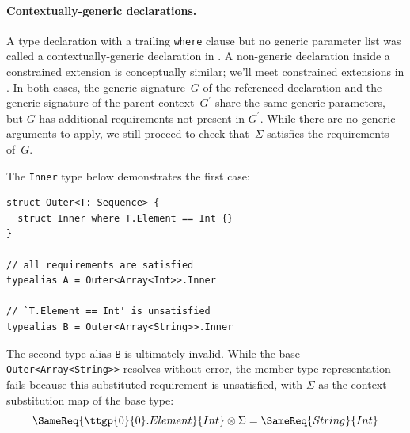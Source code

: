 \documentclass[../generics]{subfiles}
\begin{document}
\paragraph{Contextually-generic declarations.}
A type declaration with a trailing \texttt{where} clause but no generic parameter list was called a contextually-generic declaration in . A non-generic declaration inside a constrained extension is conceptually similar; we'll meet constrained extensions in . In both cases, the generic signature~$G$ of the referenced declaration and the generic signature of the parent context~$G^\prime$ share the same generic parameters, but $G$ has additional requirements not present in $G^\prime$. While there are no generic arguments to apply, we still proceed to check that~$\Sigma$ satisfies the requirements of~$G$.
\begin{example}
The \texttt{Inner} type below demonstrates the first case:
\begin{Verbatim}
struct Outer<T: Sequence> {
  struct Inner where T.Element == Int {}
}

// all requirements are satisfied
typealias A = Outer<Array<Int>>.Inner

// `T.Element == Int' is unsatisfied
typealias B = Outer<Array<String>>.Inner
\end{Verbatim}
The second type alias \texttt{B} is ultimately invalid. While the base \texttt{Outer<Array<String>>} resolves without error, the member type representation fails because this substituted requirement is unsatisfied, with $\Sigma$ as the context substitution map of the base type:
\[\SameReq{\ttgp{0}{0}.Element}{Int}\otimes\Sigma=\SameReq{String}{Int}\]
\end{example}
\end{document}
